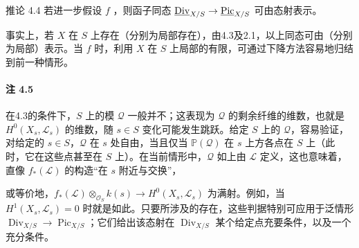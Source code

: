 \begin{statement}{推论 4.4}
若进一步假设 $f$ ，则函子同态 $\underline{\operatorname{Div}}_{X/S}\to\underline{\operatorname{Pic}}_{X/S}$ 可由态射表示。
\end{statement}
事实上，若 $X$ 在 $S$ 上存在（分别为局部存在），由4.3及2.1，以上同态可由（分别为局部）表示。当 $f$ 时，利用 $X$ 在 $S$ 上局部的有限，可通过下降方法容易地归结到前一种情形。

\paragraph{注 4.5}
在4.3的条件下，$S$ 上的模 $\mathcal Q$ 一般并不；这表现为 $\mathcal Q$ 的剩余纤维的维数，也就是 $H^0(X_s,\mathcal L_s)$ 的维数，随 $s\in S$ 变化可能发生跳跃。给定 $S$ 上的 $\mathcal Q$，容易验证，对给定的 $s\in S$，$\mathcal Q$ 在 $s$ 处自由，当且仅当 $\mathbb P(\mathcal Q)$ 在 $s$ 上方各点在 $S$ 上（此时，它在这些点甚至在 $S$ 上）。在当前情形中，$\mathcal Q$ 如上由 $\mathcal L$ 定义，这也意味着，直像 $f_*(\mathcal L)$ 的构造“在 $s$ 附近与交换”，

或等价地，$f_*(\mathcal L)\otimes_{\mathcal O_S}k(s)\to H^0(X_s,\mathcal L_s)$ 为满射。例如，当 $H^1(X_s,\mathcal L_s)=0$ 时就是如此。只要所涉及的存在，这些判据特别可应用于泛情形 $\operatorname{Div}_{X/S}\to\operatorname{Pic}_{X/S}$；它们给出该态射在 $\operatorname{Div}_{X/S}$ 某个给定点充要条件，以及一个充分条件。

